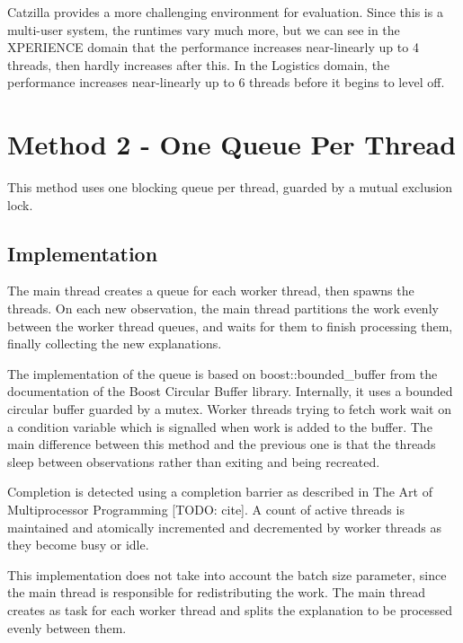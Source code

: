 \documentclass[12pt,twoside,abbrevs,msc,ai,notimes,logo,sansheadings]{infthesis}
\begin{document}
  Catzilla provides a more challenging environment for evaluation. Since this is a multi-user system, the runtimes vary much more, but we can see in the XPERIENCE domain that the performance increases near-linearly up to 4 threads, then hardly increases after this. In the Logistics domain, the performance increases near-linearly up to 6 threads before it begins to level off.
  
  \chapter {Method 2 - One Queue Per Thread}
  
  This method uses one blocking queue per thread, guarded by a mutual exclusion lock.
  
  \section {Implementation}
  
  The main thread creates a queue for each worker thread, then spawns the threads. On each new observation, the main thread partitions the work evenly between the worker thread queues, and waits for them to finish processing them, finally collecting the new explanations.
  
  The implementation of the queue is based on boost::bounded\_buffer from the documentation of the Boost Circular Buffer library. Internally, it uses a bounded circular buffer guarded by a mutex. Worker threads trying to fetch work wait on a condition variable which is signalled when work is added to the buffer. The main difference between this method and the previous one is that the threads sleep between observations rather than exiting and being recreated.
  
  Completion is detected using a completion barrier as described in The Art of Multiprocessor Programming [TODO: cite]. A count of active threads is maintained and atomically incremented and decremented by worker threads as they become busy or idle.
  
  This implementation does not take into account the batch size parameter, since the main thread is responsible for redistributing the work. The main thread creates as task for each worker thread and splits the explanation to be processed evenly between them.
  
\end{document}
